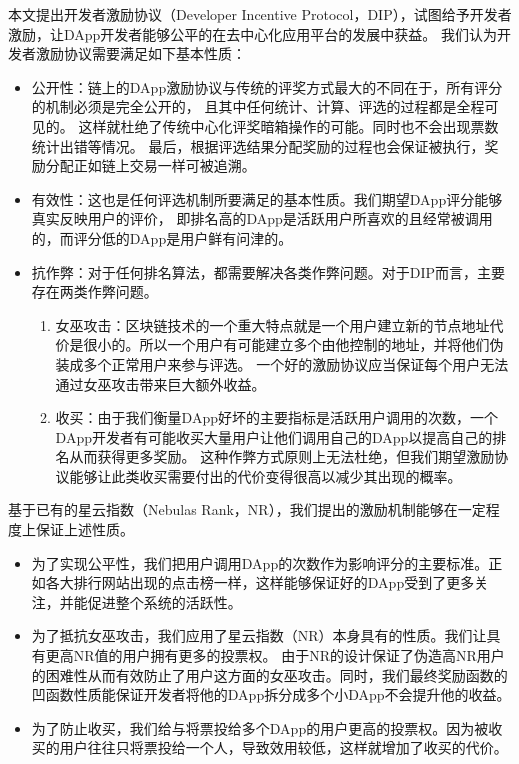 本文提出开发者激励协议（Developer Incentive Protocol，DIP），试图给予开发者激励，让DApp开发者能够公平的在去中心化应用平台的发展中获益。
我们认为开发者激励协议需要满足如下基本性质：
\begin{itemize}
	\item 公开性：链上的DApp激励协议与传统的评奖方式最大的不同在于，所有评分的机制必须是完全公开的，
	且其中任何统计、计算、评选的过程都是全程可见的。
	这样就杜绝了传统中心化评奖暗箱操作的可能。同时也不会出现票数统计出错等情况。
	最后，根据评选结果分配奖励的过程也会保证被执行，奖励分配正如链上交易一样可被追溯。
	\item 有效性：这也是任何评选机制所要满足的基本性质。我们期望DApp评分能够真实反映用户的评价，
	即排名高的DApp是活跃用户所喜欢的且经常被调用的，而评分低的DApp是用户鲜有问津的。
	\item 抗作弊：对于任何排名算法，都需要解决各类作弊问题。对于DIP而言，主要存在两类作弊问题。
	\begin{enumerate}
		\item 女巫攻击：区块链技术的一个重大特点就是一个用户建立新的节点地址代价是很小的。所以一个用户有可能建立多个由他控制的地址，并将他们伪装成多个正常用户来参与评选。
		一个好的激励协议应当保证每个用户无法通过女巫攻击带来巨大额外收益。
		\item 收买：由于我们衡量DApp好坏的主要指标是活跃用户调用的次数，一个DApp开发者有可能收买大量用户让他们调用自己的DApp以提高自己的排名从而获得更多奖励。
		这种作弊方式原则上无法杜绝，但我们期望激励协议能够让此类收买需要付出的代价变得很高以减少其出现的概率。
	\end{enumerate}
\end{itemize}

基于已有的星云指数（Nebulas Rank，NR）\cite{Nabulasyellowpaper}，我们提出的激励机制能够在一定程度上保证上述性质。
\begin{itemize}

\item 为了实现公平性，我们把用户调用DApp的次数作为影响评分的主要标准。正如各大排行网站出现的点击榜一样，这样能够保证好的DApp受到了更多关注，并能促进整个系统的活跃性。

\item 为了抵抗女巫攻击，我们应用了星云指数（NR）本身具有的性质。我们让具有更高NR值的用户拥有更多的投票权。
由于NR的设计保证了伪造高NR用户的困难性从而有效防止了用户这方面的女巫攻击。同时，我们最终奖励函数的凹函数性质能保证开发者将他的DApp拆分成多个小DApp不会提升他的收益。

\item 为了防止收买，我们给与将票投给多个DApp的用户更高的投票权。因为被收买的用户往往只将票投给一个人，导致效用较低，这样就增加了收买的代价。
\end{itemize}

